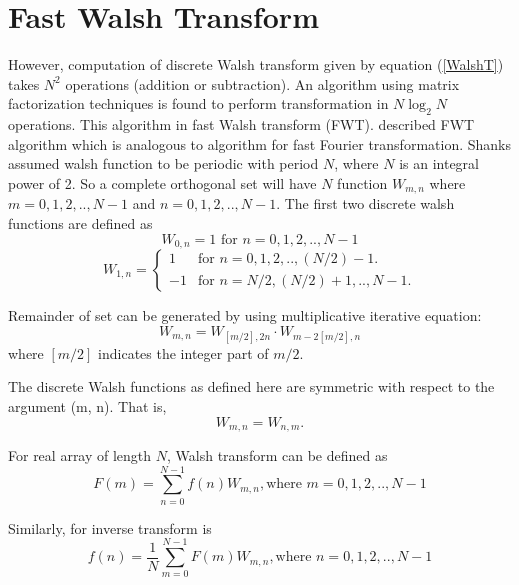 \section{Fast Walsh Transform}
However, computation of discrete Walsh transform given by equation (\ref{WalshT}) takes $N^2$ operations (addition or subtraction).
An algorithm using matrix factorization techniques is found to perform transformation in $N \log_2 N$ operations.
This algorithm in fast Walsh transform (FWT). 
\cite{Shanks1969} described FWT algorithm which is analogous to \cite{CooleyTukey1965} algorithm for fast Fourier transformation. Shanks assumed walsh function to be periodic with period $N$, where $N$ is an integral power of 2. So a complete orthogonal set will have $N$ function $W_{m,n}$ where $m = 0, 1, 2,.., N-1$ and $n = 0, 1, 2,.., N-1$. The first two discrete walsh functions are defined as 
\begin{equation}
\label{FWT1}
W_{0,n} = 1    \text{ for $n = 0, 1, 2,.., N-1$}
\end{equation}
\begin{equation}
\label{FWT2}
W_{1,n} = \begin{cases}
    1 & \text{for $n = 0, 1, 2,.., (N/2)-1$}.\\
    -1 & \text{for $n = N/2, (N/2)+1,.., N-1$}.
  \end{cases}
\end{equation}

Remainder of set can be generated by using multiplicative iterative equation: 
\begin{equation}
\label{FWT3}
W_{m,n} = W_{[m/2],2n}\cdot W_{m-2[m/2], n}
\end{equation}
where $[m/2]$ indicates the integer part of $m/2$.

The discrete Walsh functions as defined here are symmetric with respect to the argument (m, n). That is,
\[
W_{m, n} = W_{n,m}.
\]

For real array of length $N$, Walsh transform can be defined as 
\begin{equation}
\label{FWT4}
F(m) = \sum\limits_{n=0}^{N-1} f(n) W_{m,n}, \text{where $m = 0, 1, 2,.., N-1$}
\end{equation}

Similarly, for inverse transform is
\begin{equation}
\label{FWT5}
f(n) = \frac{1}{N}\sum\limits_{m=0}^{N-1} F(m) W_{m,n}, \text{where $n = 0, 1, 2,.., N-1$}
\end{equation}

